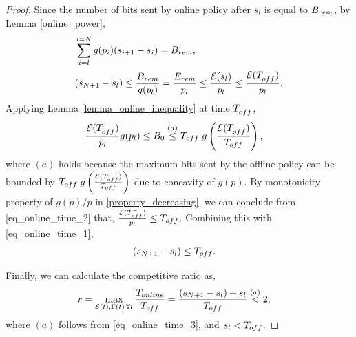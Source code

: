 \begin{proof}
Since the number of bits sent by online policy after ${s}_l$ is equal to $B_{\mbox{\scriptsize{rem}}}$, by Lemma \ref{online_power},
\begin{align}
&\sum_{i=l}^{i={N}}g(p_i)({s}_{i+1}-{s}_i)=B_{\mbox{\scriptsize{rem}}},
\\
&({s}_{{N}+1}-{s}_l)\le\frac{B_{\mbox{\scriptsize{rem}}}}{g(p_l)}=\frac{E_{\mbox{\scriptsize{rem}}}}{p_l}\le \frac{\ETx({s}_l)}{p_l}\le \frac{\ETx(T_{\mbox{\scriptsize{off}}}^-)}{p_l}.
\label{eq_online_time_1}  
\end{align}
Applying Lemma \ref{lemma_online_inequality} at time $T_{\mbox{\scriptsize{off}}}^-$,
\begin{align}
&\frac{\ETx(T_{\mbox{\scriptsize{off}}}^-)}{p_l}g(p_l)\le B_0\stackrel{(a)}{\le}T_{\mbox{\scriptsize{off}}}\; g\left(\frac{\ETx(T_{\mbox{\scriptsize{off}}}^-)}{T_{\mbox{\scriptsize{off}}}}\right),
\label{eq_online_time_2}
\end{align}
where $(a)$ holds because the maximum bits sent by the offline policy can be bounded by $T_{\mbox{\scriptsize{off}}}\; g\left(\frac{\ETx(T_{\mbox{\scriptsize{off}}}^-)}{T_{\mbox{\scriptsize{off}}}}\right)$ due to concavity of $g(p)$. By monotonicity property of $g(p)/p$ in \eqref{property_decreasing}, we can conclude from \eqref{eq_online_time_2} that, $\frac{\ETx(T_{\mbox{\scriptsize{off}}}^-)}{p_l}\le T_{\mbox{\scriptsize{off}}}$. 
Combining this with \eqref{eq_online_time_1},
\begin{align}
&({s}_{{N}+1}-{s}_l)\le T_{\mbox{\scriptsize{off}}}.
\label{eq_online_time_3}
\end{align} 

Finally, we can calculate the competitive ratio as,
\begin{align*}
&r=\displaystyle\max_{\ETx(t),\TRx(t)\hspace{0.5mm} \forall t}\dfrac{T_{\mbox{\scriptsize{online}}}}{T_{\mbox{\scriptsize{off}}}} = \dfrac{({s}_{{N}+1}-{s}_l)+{s}_l}{T_{\mbox{\scriptsize{off}}}} \stackrel{(a)}{<} 2,
\end{align*}
where $(a)$ follows from \eqref{eq_online_time_3}, and ${s}_l<T_{\mbox{\scriptsize{off}}}$.        
\end{proof}